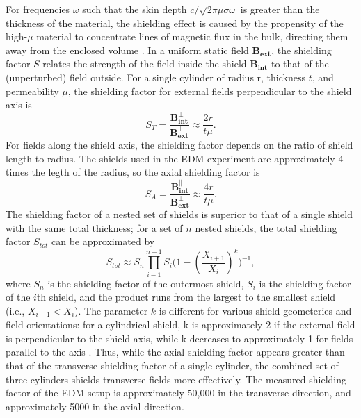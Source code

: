 \documentclass [10pt, twoside] {uwthesis}[2012/04/02]
\begin{document}
For frequencies $\omega$ such that the skin depth $c/\sqrt{2\pi\mu\sigma\omega}$ is greater than the thickness of the material, the shielding effect is caused by the propensity of the high-$\mu$ material to concentrate lines of magnetic flux in the bulk, directing them away from the enclosed volume \cite{Jackson}. In a uniform static field $\mathbf{B_{ext}}$, the shielding factor $S$ relates the strength of the field inside the shield $\mathbf{B_{int}}$ to that of the (unperturbed) field outside. For a single cylinder of radius r, thickness $t$, and permeability $\mu$, the shielding factor for external fields perpendicular to the shield axis is
\begin{equation}
S_T = \dfrac{\mathbf{B^{\bot}_{int}}}{\mathbf{B^{\bot}_{ext}}} \approx \dfrac{2r}{t\mu}.
\end{equation}
For fields along the shield axis, the shielding factor depends on the ratio of shield length to radius. The shields used in the EDM experiment are approximately 4 times the legth of the radius, so the axial shielding factor is \cite{Khriplovich_Lamoreaux}
\begin{equation}
S_A = \dfrac{\mathbf{B^{\parallel}_{int}}}{\mathbf{B^{\bot}_{ext}}}  \approx \dfrac{4r}{t\mu}.
\end{equation}
The shielding factor of a nested set of shields is superior to that of a single shield with the same total thickness; for a set of $n$ nested shields, the total shielding factor $S_{tot}$ can be approximated by
\begin{equation}
S_{tot} \approx S_n \prod_{i-1}^{n-1} S_i\big(1-(\dfrac{X_{i+1}}{X_i})^k\big)^{-1},
\end{equation}
where $S_n$ is the shielding factor of the outermost shield, $S_i$ is the shielding factor of the $i$th shield, and the product runs from the largest to the smallest shield (i.e., $X_{i+1} < X_i$). The parameter $k$ is different for various shield geometeries and field orientations: for a cylindrical shield, k is approximately 2 if the external field is perpendicular to the shield axis, while k decreases to approximately 1 for fields parallel to the axis \cite{MagShielding}. Thus, while the axial shielding factor appears greater than that of the transverse shielding factor of a single cylinder, the combined set of three cylinders shields transverse fields more effectively. The measured shielding factor of the EDM setup is approximately 50,000 in the transverse direction, and approximately 5000 in the axial direction.
\end{document}
